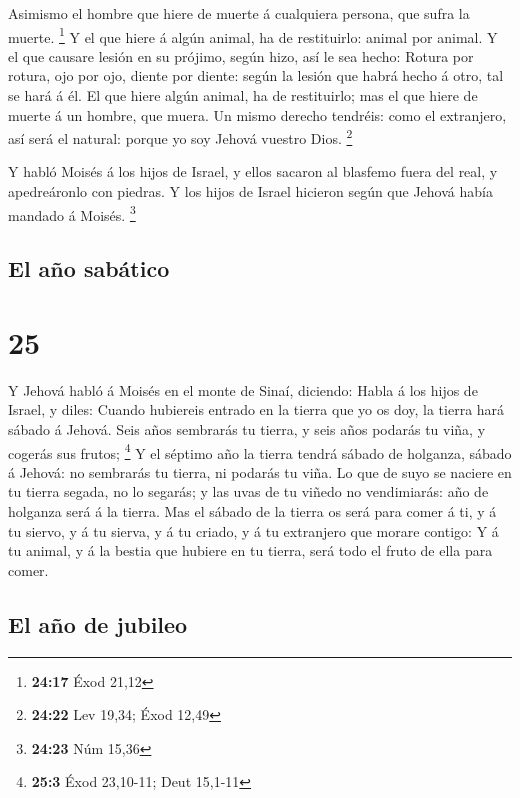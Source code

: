  Asimismo el hombre que hiere de muerte á cualquiera
persona, que sufra la muerte. \footnote{\textbf{24:17} Éxod 21,12}
 Y el que hiere á algún animal, ha de restituirlo: animal
por animal.  Y el que causare lesión en su prójimo, según
hizo, así le sea hecho:  Rotura por rotura, ojo por ojo,
diente por diente: según la lesión que habrá hecho á otro, tal se hará á
él.  El que hiere algún animal, ha de restituirlo; mas el
que hiere de muerte á un hombre, que muera.  Un mismo
derecho tendréis: como el extranjero, así será el natural: porque yo soy
Jehová vuestro Dios. \footnote{\textbf{24:22} Lev 19,34; Éxod 12,49}

 Y habló Moisés á los hijos de Israel, y ellos sacaron al
blasfemo fuera del real, y apedreáronlo con piedras. Y los hijos de
Israel hicieron según que Jehová había mandado á Moisés. \footnote{\textbf{24:23}
  Núm 15,36}

\hypertarget{el-auxf1o-sabuxe1tico}{%
\subsection{El año sabático}\label{el-auxf1o-sabuxe1tico}}

\hypertarget{section-24}{%
\section{25}\label{section-24}}

 Y Jehová habló á Moisés en el monte de Sinaí, diciendo:
 Habla á los hijos de Israel, y diles: Cuando hubiereis
entrado en la tierra que yo os doy, la tierra hará sábado á Jehová.
 Seis años sembrarás tu tierra, y seis años podarás tu
viña, y cogerás sus frutos; \footnote{\textbf{25:3} Éxod 23,10-11; Deut
  15,1-11}  Y el séptimo año la tierra tendrá sábado de
holganza, sábado á Jehová: no sembrarás tu tierra, ni podarás tu viña.
 Lo que de suyo se naciere en tu tierra segada, no lo
segarás; y las uvas de tu viñedo no vendimiarás: año de holganza será á
la tierra.  Mas el sábado de la tierra os será para comer
á ti, y á tu siervo, y á tu sierva, y á tu criado, y á tu extranjero que
morare contigo:  Y á tu animal, y á la bestia que hubiere
en tu tierra, será todo el fruto de ella para comer.

\hypertarget{el-auxf1o-de-jubileo}{%
\subsection{El año de jubileo}\label{el-auxf1o-de-jubileo}}

